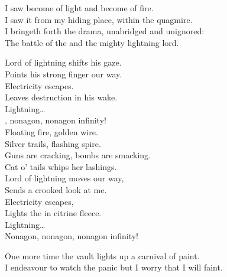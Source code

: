 I saw  become of light and  become of fire. \\
I saw it from my hiding place, within the quagmire. \\

I bringeth forth the drama, unabridged and unignored: \\
The battle of the  and the mighty lightning lord. \\





Lord of lightning shifts his gaze. \\
Points his strong finger our way. \\
Electricity escapes. \\
Leaves destruction in his wake. \\

Lightning… \\

, nonagon, nonagon infinity! \\

Floating fire, golden wire. \\
Silver trails, flashing spire. \\

Guns are cracking, bombs are smacking. \\
Cat o' tails whips her lashings. \\

Lord of lightning moves our way, \\
Sends a crooked look at me. \\
Electricity escapes, \\
Lights the  in citrine fleece. \\

Lightning… \\

Nonagon, nonagon, nonagon infinity! \\


One more time the vault lights up a carnival of paint. \\
I endeavour to watch the panic but I worry that I will faint. \\

